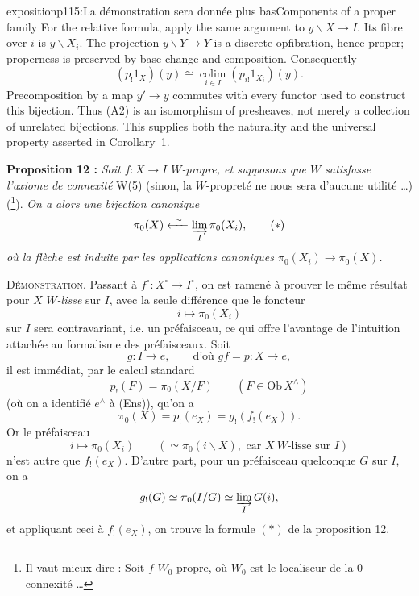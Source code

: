 \begin{dcomment}{exposition}{p115:La démonstration sera donnée plus bas}{Components of a proper family}
For the relative formula, apply the same argument to $y\backslash X\to I$.  Its fibre over $i$ is $y\backslash X_i$.  The projection $y\backslash Y\to Y$ is a discrete opfibration, hence proper; properness is preserved by base change and composition.  Consequently
\[
 (p_!1_X)(y)\cong
 \operatorname*{colim}_{i\in I}(p_{i!}1_{X_i})(y).
 \tag{A2}
\]
Precomposition by a map $y'\to y$ commutes with every functor used to construct this bijection.  Thus (A2) is an isomorphism of presheaves, not merely a collection of unrelated bijections.  This supplies both the naturality and the universal property asserted in Corollary~1.
\end{dcomment}


\textbf{Proposition 12 :} \textit{Soit $f : X \longrightarrow I$ $W$-propre, et supposons que $W$ satisfasse l'axiome de connexité} W(5) (sinon, la $W$-propreté ne nous sera d'aucune utilité \dots) (\footnote[81]{Il vaut mieux dire : Soit $f$ $W_0$-propre, où $W_0$ est le localiseur de la 0-connexité \dots}). \textit{On a alors une bijection canonique}
\[
\pi_0(X) \xleftarrow{\ \sim\ } \varinjlim_{I} \pi_0(X_i), \tag*{$(*)$}
\]
\textit{où la flèche est induite par les applications canoniques $\pi_0(X_i) \longrightarrow \pi_0(X)$.}

\textsc{Démonstration.} Passant à $f^\circ : X^\circ \longrightarrow I^\circ$, on est ramené à prouver le même résultat pour $X$ \textit{$W$-lisse} sur $I$, avec la seule différence que le foncteur
\[
i \longmapsto \pi_0(X_i)
\]
sur $I$ sera contravariant, i.e. un préfaisceau, ce qui offre l'avantage de l'intuition attachée au formalisme des préfaisceaux. Soit
\[
g : I \longrightarrow e, \qquad \text{d'où } gf = p : X \longrightarrow e,
\]
il est immédiat, par le calcul standard
\[
p_!(F) = \pi_0(X/F) \qquad (F \in \mathrm{Ob}\, X^\wedge)
\]
(où on a identifié $e^\wedge$ à (Ens)), qu'on a
\[
\pi_0(X) = p_!(e_X) = g_!(f_!(e_X)).
\]
Or le préfaisceau
\[
i \longmapsto \pi_0(X_i) \qquad (\simeq \pi_0(i\backslash X), \text{ car } X\ W\text{-lisse sur } I)
\]
n'est autre que $f_!(e_X)$. D'autre part, pour un préfaisceau quelconque $G$ sur $I$, on a
\[
g_!(G) \simeq \pi_0(I/G) \simeq \varinjlim_{I} G(i),
\]
et appliquant ceci à $f_!(e_X)$, on trouve la formule $(*)$ de la proposition 12.

